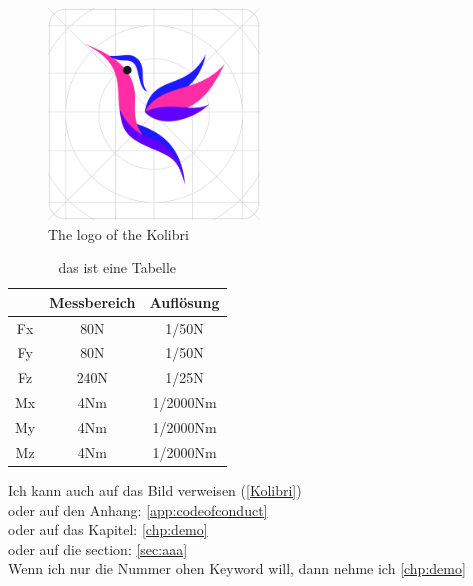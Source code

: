 \begin{figure}[H]
    \centering
    \includegraphics[width=0.5\textwidth]{./mainmatter/pictures/Demo/kolibri-logo}
    \caption{The logo of the Kolibri}
    \label{Kolibri}
\end{figure}


\begin{table}[H]
\centering
\begin{tabular}{|c|c|c|}
	\hline & Messbereich & Auflösung\\ 
	\hline Fx & 80N   & 1/50N\\ 
	\hline Fy & 80N   & 1/50N\\ 
	\hline Fz & 240N  & 1/25N\\ 
	\hline Mx & 4Nm   & 1/2000Nm\\ 
	\hline My & 4Nm   & 1/2000Nm\\ 
	\hline Mz & 4Nm   & 1/2000Nm\\
	\hline 
\end{tabular} 
\caption{das ist eine Tabelle}
\label{tbl:Tabelle}
\end{table}


Ich kann auch auf das Bild verweisen (\autoref{Kolibri})\\
oder auf den Anhang: \autoref{app:codeofconduct} \\
oder auf das Kapitel: \autoref{chp:demo}\\
oder auf die section: \autoref{sec:aaa}\\
Wenn ich nur die Nummer ohen Keyword will, dann nehme ich \ref{chp:demo}
